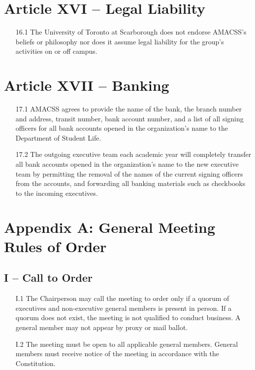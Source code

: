 \documentclass[12pt,a4paper]{article}
\begin{document}
\section*{Article XVI – Legal Liability}

\begin{enumerate}
\item[16.1] The University of Toronto at Scarborough does not endorse AMACSS's beliefs or philosophy nor does it assume legal liability for the group's activities on or off campus.
\end{enumerate}

\section*{Article XVII – Banking}

\begin{enumerate}
\item[17.1] AMACSS agrees to provide the name of the bank, the branch number and address, transit number, bank account number, and a list of all signing officers for all bank accounts opened in the organization's name to the Department of Student Life.

\item[17.2] The outgoing executive team each academic year will completely transfer all bank accounts opened in the organization's name to the new executive team by permitting the removal of the names of the current signing officers from the accounts, and forwarding all banking materials such as checkbooks to the incoming executives.
\end{enumerate}

\section*{Appendix A: General Meeting Rules of Order}

\subsection*{I – Call to Order}

\begin{enumerate}
\item[I.1] The Chairperson may call the meeting to order only if a quorum of executives and non-executive general members is present in person. If a quorum does not exist, the meeting is not qualified to conduct business. A general member may not appear by proxy
or mail ballot.

\item[I.2] The meeting must be open to all applicable general members. General members must receive notice of the meeting in accordance with the Constitution.
\end{enumerate}
\end{document}
